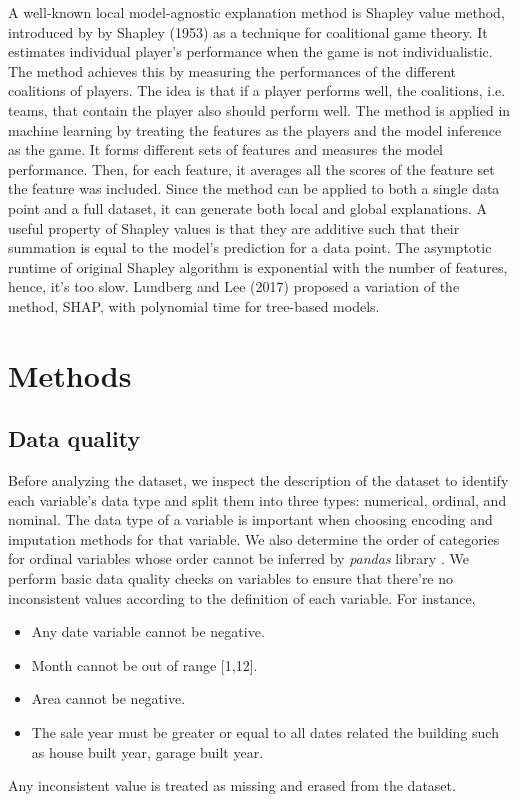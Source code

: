 \documentclass[conference]{IEEEtran}
\begin{document}
A well-known local model-agnostic explanation method is Shapley value method, introduced by
by Shapley (1953) \cite{shapley1953value} as a technique for coalitional game theory. It estimates 
individual player's performance when the game is not individualistic. The method
achieves this by measuring the performances of the different coalitions of
players. The idea is that if a player performs well, the coalitions, i.e. teams, 
that contain the player also should perform well. The method is applied in machine learning
by treating the features as the players and the model inference as the game. It
forms different sets of features and measures the model performance. Then, for each feature, 
it averages all the scores of the feature set the feature was included. Since the method can be
applied to both a single data point and a full dataset, it can generate both local and global 
explanations. 
A useful property of Shapley values is that they are additive such that their summation is equal to the model's prediction for a data point. 
The asymptotic runtime of original Shapley algorithm is exponential with the number of features, hence, it's too slow. 
Lundberg and Lee (2017) \cite{Lundberg2017} proposed a variation of the method, SHAP, with polynomial time for tree-based models.

\section{Methods}

\subsection{Data quality}

Before analyzing the dataset, we inspect the description of the dataset to identify each variable's data type and split them into three types: numerical, ordinal, and nominal. The data type of a variable is important when choosing encoding and imputation methods for that variable. 
We also determine the order of categories for ordinal variables whose order cannot be inferred by \textit{pandas} library \cite{pandas}.
We perform basic data quality checks on variables to ensure that there're no inconsistent values according to the definition of each variable. For instance,
\begin{itemize}
    \item Any date variable cannot be negative.
    \item Month cannot be out of range [1,12].
    \item Area cannot be negative.
    \item The sale year must be greater or equal to all dates related the building such as house built year, garage built year.
\end{itemize}
Any inconsistent value is treated as missing and erased from the dataset.
\end{document}
